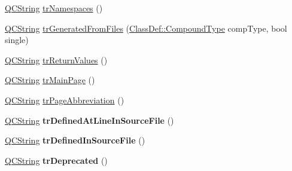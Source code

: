 \begin{DoxyCompactItemize}
\item 
\hyperlink{class_q_c_string}{Q\-C\-String} \hyperlink{class_translator_dutch_abb4bb29699b00eecd57abd489abbffd0}{tr\-Namespaces} ()
\item 
\hyperlink{class_q_c_string}{Q\-C\-String} \hyperlink{class_translator_dutch_a2c9f8ab8b1a6ef2b514ceaf4f2fbfcdb}{tr\-Generated\-From\-Files} (\hyperlink{class_class_def_a768a6f0a6fd7e9087ff7971abbcc3f36}{Class\-Def\-::\-Compound\-Type} comp\-Type, bool single)
\item 
\hyperlink{class_q_c_string}{Q\-C\-String} \hyperlink{class_translator_dutch_a6e464db5f9409cf3e05373c732034db5}{tr\-Return\-Values} ()
\item 
\hyperlink{class_q_c_string}{Q\-C\-String} \hyperlink{class_translator_dutch_a55afa9d76071992e385357f6cffb37ae}{tr\-Main\-Page} ()
\item 
\hyperlink{class_q_c_string}{Q\-C\-String} \hyperlink{class_translator_dutch_a4248866912d235cac5f7336db70fff9a}{tr\-Page\-Abbreviation} ()
\item 
\hypertarget{class_translator_dutch_adc253b88ffe7628a37260627a8c0b29a}{\hyperlink{class_q_c_string}{Q\-C\-String} {\bfseries tr\-Defined\-At\-Line\-In\-Source\-File} ()}\label{class_translator_dutch_adc253b88ffe7628a37260627a8c0b29a}

\item 
\hypertarget{class_translator_dutch_aa11e744c82b96bf72abdf5edeed3ea55}{\hyperlink{class_q_c_string}{Q\-C\-String} {\bfseries tr\-Defined\-In\-Source\-File} ()}\label{class_translator_dutch_aa11e744c82b96bf72abdf5edeed3ea55}

\item 
\hypertarget{class_translator_dutch_ae6520e844a4d922882ef91f7598c792f}{\hyperlink{class_q_c_string}{Q\-C\-String} {\bfseries tr\-Deprecated} ()}\label{class_translator_dutch_ae6520e844a4d922882ef91f7598c792f}


\end{DoxyCompactItemize}
